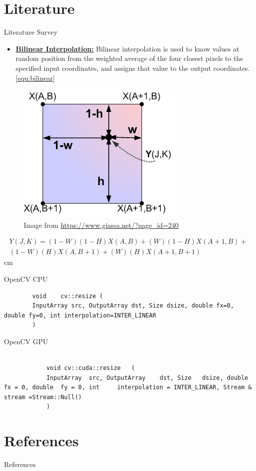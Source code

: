 \documentclass{beamer}
\begin{document}
\section{Literature}
	\begin{frame}{Literature Survey}
		\begin{itemize}
			\item \justifying \textbf{\underline{Bilinear Interpolation:}} Bilinear interpolation is used to know values at 	random position from the weighted average of the 	four closest pixels to the specified input coordinates, and assigns that value to the output coordinates.\cite{fadnavis2014image}  \eqref{equ:bilinear}
		\end{itemize}
	\end{frame}
	\begin{frame}
		\begin{figure}
			\includegraphics[scale=0.5]{./Figures/bilinear_interpolation.png}
			\caption{\label{fig:bilinear_img}Image from \url{https://www.giassa.net/?page_id=240}\cite{bilinear_img}}
		\end{figure}
		\begin{multline}\label{equ:bilinear}
			Y(J,K)=(1-W)(1-H)X(A,B)+(W)(1-H)X(A+1,B)+\\(1-W)(H)X(A,B+1)+(W)(H)X(A+1,B+1)
		\end{multline} cm
	\end{frame}
	\begin{frame}[fragile]
	\begin{block}{OpenCV CPU}		
	\end{block}
		\begin{lstlisting}
		void 	cv::resize (
		InputArray src, OutputArray dst, Size dsize, double fx=0, double fy=0, int interpolation=INTER_LINEAR
		)
		\end{lstlisting}
	
		\begin{block}{OpenCV GPU}		
		\end{block}
			\begin{lstlisting}
			
			void cv::cuda::resize	(
			InputArray 	src, OutputArray 	dst, Size 	dsize, double 	fx = 0, double 	fy = 0, int 	interpolation = INTER_LINEAR, Stream & 	stream =Stream::Null() 
			)	
			\end{lstlisting}
		\end{frame}

\section{References}
	\begin{block}{References}
	\end{block}
	
	
\end{document}
